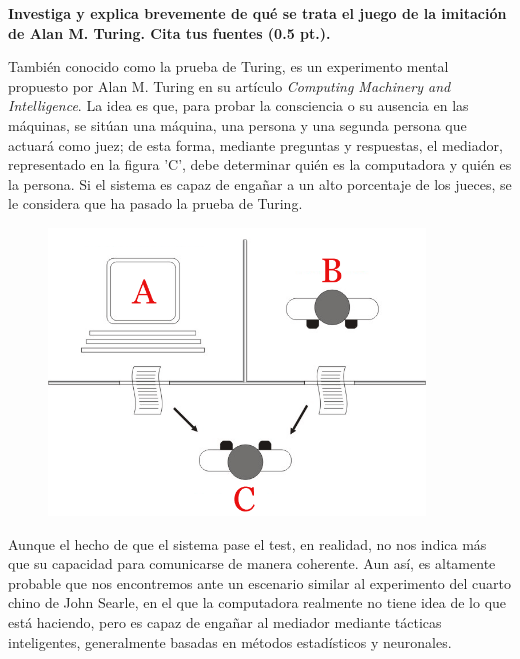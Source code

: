 \textbf{Investiga y explica brevemente de qué se trata el juego de la imitación de Alan M. Turing. Cita tus fuentes (0.5 pt.).}

También conocido como la prueba de Turing, es un experimento mental propuesto por Alan M. Turing en su artículo \textit{Computing Machinery and Intelligence}. La idea es que, para probar la consciencia o su ausencia en las máquinas, se sitúan una máquina, una persona y una segunda persona que actuará como juez; de esta forma, mediante preguntas y respuestas, el mediador, representado en la figura 'C', debe determinar quién es la computadora y quién es la persona. Si el sistema es capaz de engañar a un alto porcentaje de los jueces, se le considera que ha pasado la prueba de Turing. \vspace{.3cm}

\cite{turing1950computing}

\begin{figure}[H]
    \includegraphics[width=10cm]{src/Img/Turing_test_diagram.png}
    \centering
    \caption{\cite{testTuring}}
\end{figure}

Aunque el hecho de que el sistema pase el test, en realidad, no nos indica más que su capacidad para comunicarse de manera coherente. Aun así, es altamente probable que nos encontremos ante un escenario similar al experimento del cuarto chino de John Searle, en el que la computadora realmente no tiene idea de lo que está haciendo, pero es capaz de engañar al mediador mediante tácticas inteligentes, generalmente basadas en métodos estadísticos y neuronales. \vspace{.3cm}
